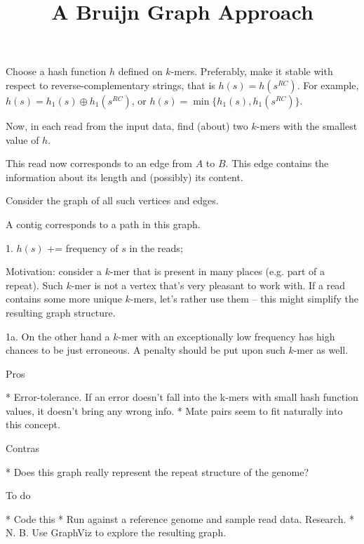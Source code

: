 \documentclass[12pt]{article}
\begin{document}
\title{A Bruijn Graph Approach}

Choose a hash function $h$ defined on $k$-mers. 
Preferably, make it stable with respect to reverse-complementary 
strings, that is $h(s) = h(s^{RC})$. For example, 
$h(s) = h_1(s) \oplus h_1(s^{RC})$, or $h(s) = \min\{h_1(s), h_1(s^{RC})\}$.



Now, in each read from the input data, find (about) two $k$-mers 
with the smallest value of $h$.

This read now corresponds to an edge from $A$ to $B$. This edge 
contains the information about its length and (possibly) its content.

Consider the graph of all such vertices and edges.

A contig corresponds to a path in this graph.

1. $h(s)$ += frequency of $s$ in the reads;

Motivation: consider a $k$-mer that is present in many 
places (e.g. part of a repeat). Such $k$-mer is not a vertex 
that's very pleasant to work with. If a read contains some more 
unique $k$-mers, let's rather use them -- this might simplify 
the resulting graph structure.

1a. On the other hand a $k$-mer with an exceptionally low frequency 
has high chances to be just erroneous. A penalty should be put upon 
such $k$-mer as well.

Pros

    * Error-tolerance. If an error doesn't fall into the 
    k-mers with small hash function values, it doesn't bring any wrong info.
    * Mate pairs seem to fit naturally into this concept. 

Contras

    * Does this graph really represent the repeat structure of the genome? 

To do

    * Code this
    * Run against a reference genome and sample read data. Research.
    * N. B. Use GraphViz to explore the resulting graph. 
\end{document}
